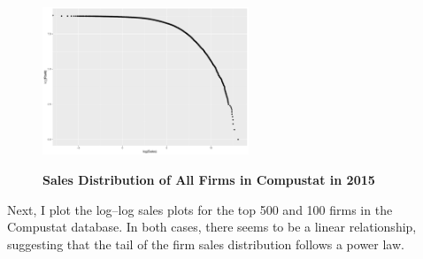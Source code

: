 \documentclass[12pt]{article}
\begin{document}
\begin{figure}[htbp!]
\centering
\caption{\textbf{Sales Distribution of All Firms in Compustat in 2015}}
\includegraphics[width=0.55\textwidth]{2015-sales-full.pdf}
\label{fig1}
\end{figure}

Next, I plot the log--log sales plots for the top 500 and 100 firms in the Compustat database. In both cases, there seems to be a linear relationship, suggesting that the tail of the firm sales distribution follows a power law.
\end{document}

